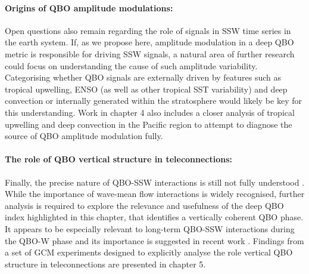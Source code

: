 \paragraph{Origins of QBO amplitude modulations:} Open questions also remain regarding the role of signals in SSW time series in the earth system. If, as we propose here, amplitude modulation in a deep QBO metric is responsible for driving SSW signals, a natural area of further research could focus on understanding the cause of such amplitude variability. Categorising whether QBO signals are externally driven by features such as tropical upwelling, ENSO (as well as other tropical SST variability) and deep convection or internally generated within the stratosphere would likely be key for this understanding. Work in chapter 4 also includes a closer analysis of tropical upwelling and deep convection in the Pacific region to attempt to diagnose the source of QBO amplitude modulation fully.

\paragraph{The role of QBO vertical structure in teleconnections:} Finally, the precise nature of QBO-SSW interactions is still not fully understood \citep{ansteyHighlatitude2014b}. While the importance of wave-mean flow interactions is widely recognised, further analysis is required to explore the relevance and usefulness of the deep QBO index highlighted in this chapter, that identifies a vertically coherent QBO phase. It appears to be especially relevant to long-term QBO-SSW interactions during the QBO-W phase and its importance is suggested in recent work \citep{andrewsObserved2019d}. Findings from a set of GCM experiments designed to explicitly analyse the role vertical QBO structure in teleconnections are presented in chapter 5. 
